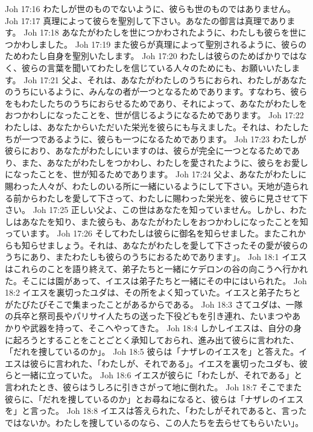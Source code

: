 Joh 17:16  わたしが世のものでないように、彼らも世のものではありません。
Joh 17:17  真理によって彼らを聖別して下さい。あなたの御言は真理であります。
Joh 17:18  あなたがわたしを世につかわされたように、わたしも彼らを世につかわしました。
Joh 17:19  また彼らが真理によって聖別されるように、彼らのためわたし自身を聖別いたします。
Joh 17:20  わたしは彼らのためばかりではなく、彼らの言葉を聞いてわたしを信じている人々のためにも、お願いいたします。
Joh 17:21  父よ、それは、あなたがわたしのうちにおられ、わたしがあなたのうちにいるように、みんなの者が一つとなるためであります。すなわち、彼らをもわたしたちのうちにおらせるためであり、それによって、あなたがわたしをおつかわしになったことを、世が信じるようになるためであります。
Joh 17:22  わたしは、あなたからいただいた栄光を彼らにも与えました。それは、わたしたちが一つであるように、彼らも一つになるためであります。
Joh 17:23  わたしが彼らにおり、あなたがわたしにいますのは、彼らが完全に一つとなるためであり、また、あなたがわたしをつかわし、わたしを愛されたように、彼らをお愛しになったことを、世が知るためであります。
Joh 17:24  父よ、あなたがわたしに賜わった人々が、わたしのいる所に一緒にいるようにして下さい。天地が造られる前からわたしを愛して下さって、わたしに賜わった栄光を、彼らに見させて下さい。
Joh 17:25  正しい父よ、この世はあなたを知っていません。しかし、わたしはあなたを知り、また彼らも、あなたがわたしをおつかわしになったことを知っています。
Joh 17:26  そしてわたしは彼らに御名を知らせました。またこれからも知らせましょう。それは、あなたがわたしを愛して下さったその愛が彼らのうちにあり、またわたしも彼らのうちにおるためであります」。
Joh 18:1  イエスはこれらのことを語り終えて、弟子たちと一緒にケデロンの谷の向こうへ行かれた。そこには園があって、イエスは弟子たちと一緒にその中にはいられた。
Joh 18:2  イエスを裏切ったユダは、その所をよく知っていた。イエスと弟子たちとがたびたびそこで集まったことがあるからである。
Joh 18:3  さてユダは、一隊の兵卒と祭司長やパリサイ人たちの送った下役どもを引き連れ、たいまつやあかりや武器を持って、そこへやってきた。
Joh 18:4  しかしイエスは、自分の身に起ろうとすることをことごとく承知しておられ、進み出て彼らに言われた、「だれを捜しているのか」。
Joh 18:5  彼らは「ナザレのイエスを」と答えた。イエスは彼らに言われた、「わたしが、それである」。イエスを裏切ったユダも、彼らと一緒に立っていた。
Joh 18:6  イエスが彼らに「わたしが、それである」と言われたとき、彼らはうしろに引きさがって地に倒れた。
Joh 18:7  そこでまた彼らに、「だれを捜しているのか」とお尋ねになると、彼らは「ナザレのイエスを」と言った。
Joh 18:8  イエスは答えられた、「わたしがそれであると、言ったではないか。わたしを捜しているのなら、この人たちを去らせてもらいたい」。
